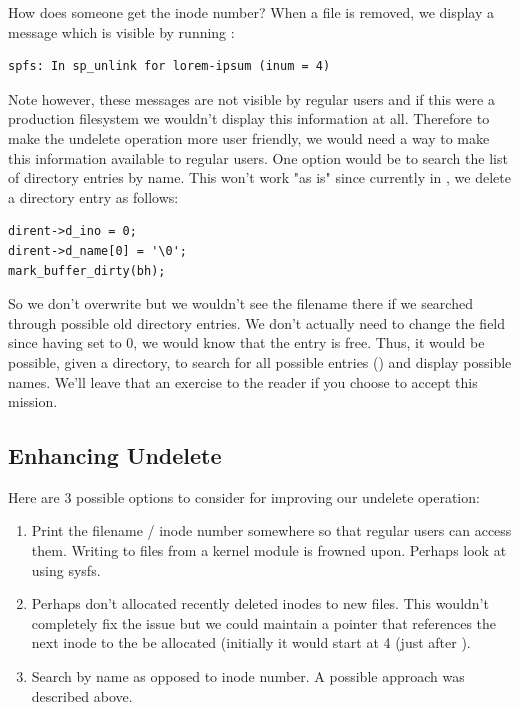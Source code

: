 \noindent
How does someone get the inode number? When a file is removed, we display a message which is visible by running :

\begin{lstlisting}
spfs: In sp_unlink for lorem-ipsum (inum = 4)
\end{lstlisting}

\noindent
Note however, these messages are not visible by regular users and if this were a production filesystem we wouldn't display this information at all. Therefore to make the undelete operation more user friendly, we would need a way to make this information available to regular users. One option would be to search the list of directory entries by name. This won't work "as is" since currently in , we delete a directory entry as follows:

\begin{lstlisting}
dirent->d_ino = 0;
dirent->d_name[0] = '\0';
mark_buffer_dirty(bh);
\end{lstlisting}

\noindent
So we don't overwrite  but we wouldn't see the filename there if we searched through possible old directory entries. We don't actually need to change the  field since having  set to 0, we would know that the entry is free. Thus, it would be possible, given a directory, to search for all possible entries () and display possible names. We'll leave that an exercise to the reader if you choose to accept this mission.


\subsection{Enhancing Undelete}

Here are 3 possible options to consider for improving our undelete operation:

\begin{enumerate}
	\item Print the filename / inode number somewhere so that regular users can access them. Writing to
		files from a kernel module is frowned upon. Perhaps
		look at using sysfs. %
	\item Perhaps don't allocated recently deleted inodes to new files. This wouldn't completely fix the issue
		but we could maintain a pointer that references the next inode to the be allocated (initially it would
		start at 4 (just after ). 
	\item Search by name as opposed to inode number. A possible approach was described above.
\end{enumerate}

